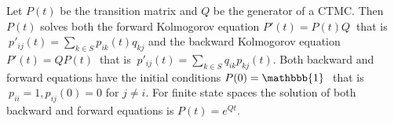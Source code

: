  Let $P(t)$ be the transition matrix and $Q$ be the generator of a CTMC. Then $P(t)$ solves both the forward Kolmogorov equation
$P'(t) = P(t)Q\ $ that is $\ p'_{ij}(t) = \sum_{k \in S} p_{ik}(t) q_{kj}$ and the backward Kolmogorov equation
$P'(t) = QP(t)\ $ that is $\ p'_{ij}(t) = \sum_{k \in S} q_{ik}p_{kj}(t).$
Both backward and forward equations have the initial conditions 
$P(0) = \mathbbb{1}\ $ that is $\ p_{ii} = 1, p_{ij}(0) = 0$ for $j \ne i$.
 For finite state spaces the solution of both backward and forward equations is $P(t) = e^{Qt}.$